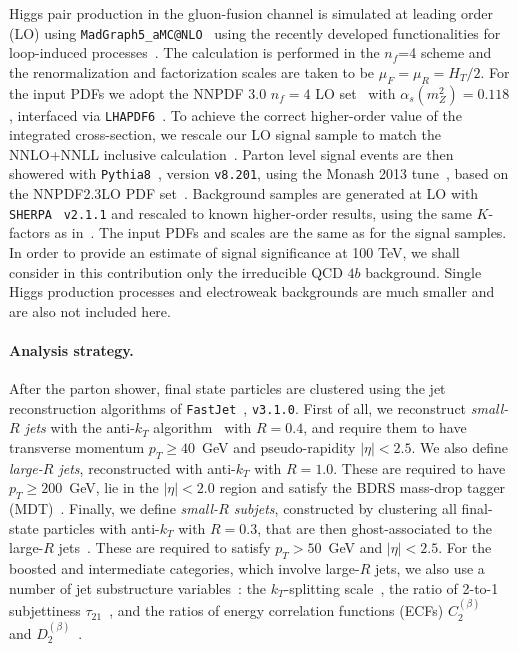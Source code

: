 \documentclass[a4paper,10pt]{article}
\begin{document}
Higgs pair production in the gluon-fusion
channel is simulated at leading order (LO) using
{\tt MadGraph5\_aMC@NLO}~\cite{Alwall:2014hca,Maltoni:2014eza}
using the recently developed functionalities for
loop-induced processes~\cite{Hirschi:2015iia}.
%
The calculation is performed in the
$n_f$=4 scheme and
the renormalization and factorization
scales are taken to be $\mu_F=\mu_R=H_T/2$.
%
For the input PDFs we 
adopt the NNPDF 3.0 $n_f=4$ LO set~\cite{Ball:2014uwa} with
$\alpha_s(m_Z^2)=0.118$,
interfaced via {\tt LHAPDF6}~\cite{Buckley:2014ana}.
%
To achieve the correct higher-order value of the
integrated cross-section, we rescale our LO signal sample to match the
NNLO+NNLL
inclusive calculation~\cite{deFlorian:2013jea,deFlorian:2015moa}.
%
Parton level signal events are then showered with
{\tt Pythia8}~\cite{Sjostrand:2007gs,Sjostrand:2014zea}, version {\tt v8.201},
using the  Monash 2013 tune~\cite{Skands:2014pea},
based on the NNPDF2.3LO PDF set~\cite{Ball:2012cx,Ball:2013hta}.
%
Background samples are generated at LO
with {\tt SHERPA}~\cite{Gleisberg:2008ta} {\tt v2.1.1}
and rescaled to known higher-order results, using
the same $K$-factors as in~\cite{Behr:2015oqq}. 
%
The input PDFs and scales are the same as for
the signal samples.
%
In order to provide an estimate of signal significance at 100 TeV,
we shall consider in this
contribution only the irreducible QCD $4b$ background.
%
Single Higgs production processes and electroweak backgrounds
are much smaller and are also not included here.
%


\paragraph{Analysis strategy.}
After the parton shower, final state particles
are clustered using the
jet reconstruction algorithms
of
{\tt FastJet}~\cite{Cacciari:2011ma,Cacciari:2005hq},
{\tt v3.1.0}.
%
First of all, we reconstruct {\it small-$R$ jets} with the
anti-$k_T$ algorithm~\cite{Cacciari:2008gp} with $R=0.4$,
and  require them
  to have transverse momentum $p_T \ge 40$~GeV
  and pseudo-rapidity $|\eta|<2.5$.
  We also define {\it large-$R$ jets},  reconstructed with 
  anti-$k_T$ with $R=1.0$.
  These
 are
   required to have
  $p_T \ge 200$~GeV, lie in the
  $|\eta|<2.0$ region and
   satisfy the  BDRS mass-drop tagger (MDT)~\cite{Butterworth:2008iy}.
   Finally, we define
  {\it small-$R$ subjets}, constructed  
  by clustering all final-state particles with
 anti-$k_T$ with  $R=0.3$, that are then
 ghost-associated  to the large-$R$ jets~\cite{Aad:2015uka}.
 These
  are required to satisfy
  $p_T > 50$~GeV and $|\eta|<2.5$.
For the   boosted and intermediate categories,
which involve large-$R$ jets,
we also use a number of jet substructure variables~\cite{Salam:2009jx,Aad:2013gja}:
the $k_T$-splitting scale~\cite{Butterworth:2002tt,Butterworth:2008iy}, the ratio of 2-to-1 subjettiness $\tau_{21}$~\cite{Thaler:2010tr,Thaler:2011gf}, and the ratios of energy correlation functions (ECFs)  $C^{(\beta)}_2$~\cite{Larkoski:2013eya} and
$D_2^{(\beta)}$~\cite{Larkoski:2014gra}.
\end{document}
